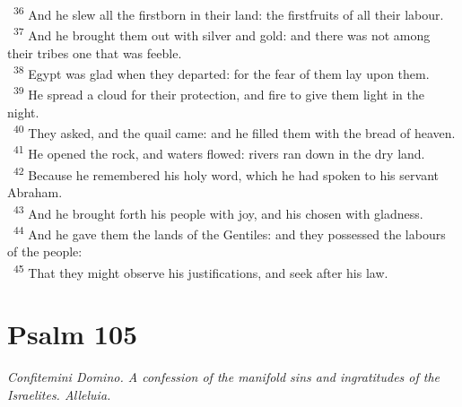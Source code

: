 \documentclass[a5paper,12pt]{article}
\begin{document}
\begin{multicols*}{2}
~\textsuperscript{36} And he slew all the firstborn in their land: the firstfruits of all their labour.\\
~\textsuperscript{37} And he brought them out with silver and gold: and there was not among their tribes one that was feeble.\\
~\textsuperscript{38} Egypt was glad when they departed: for the fear of them lay upon them.\\
~\textsuperscript{39} He spread a cloud for their protection, and fire to give them light in the night.\\
~\textsuperscript{40} They asked, and the quail came: and he filled them with the bread of heaven.\\
~\textsuperscript{41} He opened the rock, and waters flowed: rivers ran down in the dry land.\\
~\textsuperscript{42} Because he remembered his holy word, which he had spoken to his servant Abraham.\\
~\textsuperscript{43} And he brought forth his people with joy, and his chosen with gladness.\\
~\textsuperscript{44} And he gave them the lands of the Gentiles: and they possessed the labours of the people:\\
~\textsuperscript{45} That they might observe his justifications, and seek after his law.\\

\section{Psalm 105}
\label{sec:org8b08b70}
\emph{Confitemini Domino. A confession of the manifold sins and ingratitudes of the Israelites. Alleluia.}\\


\end{multicols*}
\end{document}
